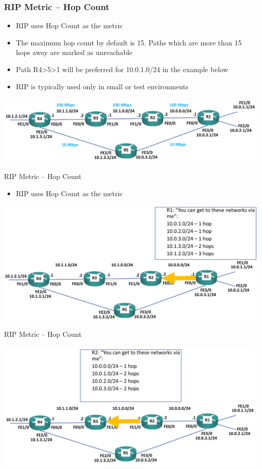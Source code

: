 \documentclass[pdflatex,compress,mathserif]{beamer}
\begin{document}
\begin{frame}
	\frametitle{RIP Metric – Hop Count}
	\begin{itemize}
		\item RIP uses Hop Count as the metric
		\item The maximum hop count by default is 15. Paths which are more than 15
hops away are marked as unreachable
		\item Path R4>5>1 will be preferred for 10.0.1.0/24 in the example below
		\item RIP is typically used only in small or test environments
	\end{itemize}
	\begin{center}
		\includegraphics[width=\linewidth]{img/img09}
	\end{center}
\end{frame}

\begin{frame}{RIP Metric – Hop Count}
	\begin{itemize}
		\item RIP uses Hop Count as the metric
	\end{itemize}
	\begin{center}
		\includegraphics[width=\linewidth]{img/img10}
	\end{center}
\end{frame}

\begin{frame}{RIP Metric – Hop Count}
	\begin{center}
		\includegraphics[width=\linewidth]{img/img11}
	\end{center}
\end{frame}
\end{document}

